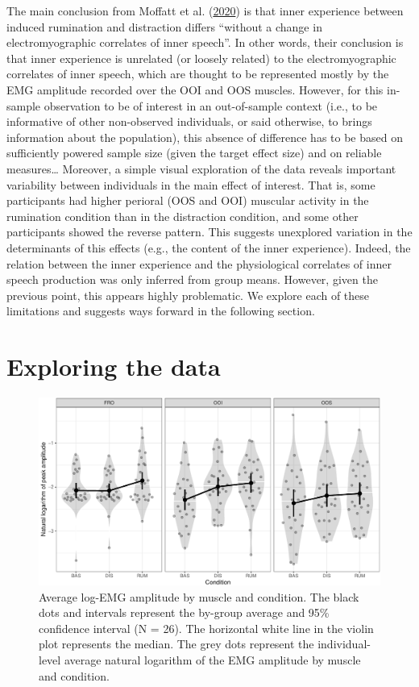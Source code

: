 \documentclass[
  english,
  man,floatsintext]{apa6}
\begin{document}
The main conclusion from Moffatt et al. (\protect\hyperlink{ref-moffatt_inner_2020}{2020}) is that inner experience between induced rumination and distraction differs ``without a change in electromyographic correlates of inner speech''. In other words, their conclusion is that inner experience is unrelated (or loosely related) to the electromyographic correlates of inner speech, which are thought to be represented mostly by the EMG amplitude recorded over the OOI and OOS muscles. However, for this in-sample observation to be of interest in an out-of-sample context (i.e., to be informative of other non-observed individuals, or said otherwise, to brings information about the population), this absence of difference has to be based on sufficiently powered sample size (given the target effect size) and on reliable measures\ldots{} Moreover, a simple visual exploration of the data reveals important variability between individuals in the main effect of interest. That is, some participants had higher perioral (OOS and OOI) muscular activity in the rumination condition than in the distraction condition, and some other participants showed the reverse pattern. This suggests unexplored variation in the determinants of this effects (e.g., the content of the inner experience). Indeed, the relation between the inner experience and the physiological correlates of inner speech production was only inferred from group means. However, given the previous point, this appears highly problematic. We explore each of these limitations and suggests ways forward in the following section.

\hypertarget{exploring-the-data}{%
\section{Exploring the data}\label{exploring-the-data}}

\begin{figure}[!htb]

{\centering \includegraphics[width=1\linewidth]{reanalysis_files/figure-latex/general-1} 

}

\caption{Average log-EMG amplitude by muscle and condition. The black dots and intervals represent the by-group average and 95\% confidence interval (N = 26). The horizontal white line in the violin plot represents the median. The grey dots represent the individual-level average natural logarithm of the EMG amplitude by muscle and condition.}\label{fig:general}
\end{figure}
\end{document}
